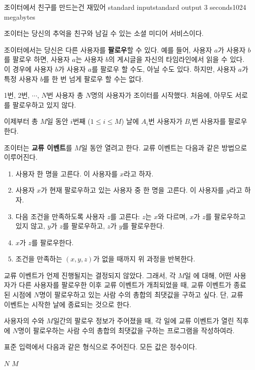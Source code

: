 \begin{problem}{조이터에서 친구를 만드는건 재밌어}
	{standard input}{standard output}
	{3 seconds}{1024 megabytes}{}
	
	조이터는 당신의 추억을 친구와 남길 수 있는 소셜 미디어 서비스이다.
	
	조이터에서는 당신은 다른 사용자를 \textbf{팔로우}할 수 있다. 예를 들어, 사용자 $a$가 사용자 $b$를 팔로우 하면, 사용자 $a$는 사용자 $b$의 게시글을 자신의 타임라인에서 읽을 수 있다. 이 경우에 사용자 $b$가 사용자 $a$를 팔로우 할 수도, 아닐 수도 있다. 하지만, 사용자 $a$가 특정 사용자 $b$를 한 번 넘게 팔로우 할 수는 없다.
	
	1번, 2번, $\cdots$, $N$번 사용자 총 $N$명의 사용자가 조이터를 시작했다. 처음에, 아무도 서로를 팔로우하고 있지 않다.
	
	이제부터 총 $M$일 동안 $i$번째 ($1 \le i \le M$) 날에 $A_i$번 사용자가 $B_i$번 사용자를 팔로우한다. 
	
	조이터는 \textbf{교류 이벤트}를 $M$일 동안 열려고 한다. 교류 이벤트는 다음과 같은 방법으로 이루어진다.
	
	\begin{enumerate}
		\item 사용자 한 명을 고른다. 이 사용자를 $x$라고 하자.
		\item 사용자 $x$가 현재 팔로우하고 있는 사용자 중 한 명을 고른다. 이 사용자를 $y$라고 하자.
		\item 다음 조건을 만족하도록 사용자 $z$를 고른다: $z$는 $x$와 다르며, $x$가 $z$를 팔로우하고 있지 않고, $y$가 $z$를 팔로우하고, $z$가 $y$를 팔로우한다.
		\item $x$가 $z$를 팔로우한다.
		\item 조건을 만족하는 $(x, y, z)$가 없을 때까지 위 과정을 반복한다.
	\end{enumerate}
	
	교류 이벤트가 언제 진행될지는 결정되지 않았다. 그래서, 각 $M$일 에 대해, 어떤 사용자가 다른 사용자를 팔로우한 이후 교류 이벤트가 개최되었을 때, 교류 이벤트가 종료된 시점에 $N$명이 팔로우하고 있는 사람 수의 총합의 최댓값을 구하고 싶다. 단, 교류 이벤트는 시작한 날에 종료되는 것으로 한다.
	
	사용자의 수와 $M$일간의 팔로우 정보가 주어졌을 때, 각 일에 교류 이벤트가 열린 직후에 $N$명이 팔로우하는 사람 수의 총합의 최댓값을 구하는 프로그램을 작성하여라.
	
	
\InputFile

표준 입력에서 다음과 같은 형식으로 주어진다. 모든 값은 정수이다.

$N$ $M$


\end{problem}

